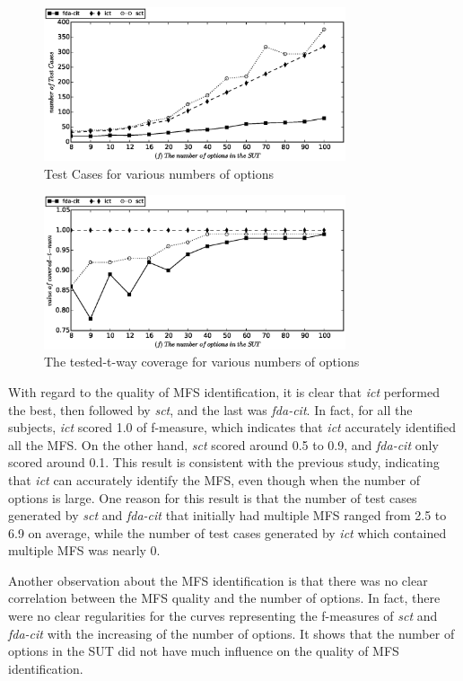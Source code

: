 \documentclass[journal,12pt,onecolumn,draftclsnofoot,]{IEEEtran}
\begin{document}
\begin{figure}[htbp]
 \includegraphics[width=3.5in]{sens_options_tests.eps}
\caption{Test Cases for various numbers of options}
\label{sen_opts_tests_result}
\end{figure}

\begin{figure}[htbp]
 \includegraphics[width=3.5in]{num_option_t_tuple.eps}
\caption{The tested-t-way coverage for various numbers of options}
\label{sen_option_t_tuple_result}
\end{figure}

With regard to the quality of MFS identification, it is clear that \emph{ict} performed the best, then followed by \emph{sct}, and the last was \emph{fda-cit}. In fact, for all the subjects, \emph{ict} scored 1.0 of f-measure, which indicates that \emph{ict} accurately identified all the MFS. On the other hand, \emph{sct} scored around 0.5 to 0.9, and \emph{fda-cit} only scored around 0.1.  This result is consistent with the previous study, indicating that \emph{ict} can accurately identify the MFS, even though when the number of options is large. {\color{red}One reason for this result is that the number of test cases generated by \emph{sct} and \emph{fda-cit} that initially had multiple MFS ranged from 2.5 to 6.9 on average, while the number of test cases generated by \emph{ict} which contained multiple MFS was nearly 0. }

Another observation about the MFS identification is that there was no clear correlation between the MFS quality and the number of options. In fact, there were no clear regularities for the curves representing the f-measures of \emph{sct} and \emph{fda-cit} with the increasing of the number of options. It shows that the number of options in the SUT did not have much influence on the quality of MFS identification.
\end{document}
